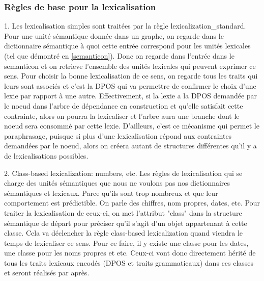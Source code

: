 \subsubsection{Règles de base pour la lexicalisation}

1. Les lexicalisation simples sont traitées par la règle lexicalization\_standard. Pour une unité sémantique donnée dans un graphe, on regarde dans le dictionnaire sémantique à quoi cette entrée correspond pour les unités lexicales (tel que démontré en \ref{semanticon}). Donc on regarde dans l'entrée dans le semanticon et on retrieve l'ensemble des unités lexicales qui peuvent exprimer ce sens. Pour choisir la bonne lexicalisation de ce sens, on regarde tous les traits qui leurs sont associés et c'est la DPOS qui va permettre de confirmer le choix d'une lexie par rapport à une autre. Effectivement, si la lexie a la DPOS demandée par le noeud dans l'arbre de dépendance en construction et qu'elle satisfait cette contrainte, alors on pourra la lexicaliser et l'arbre aura une branche dont le noeud sera consommé par cette lexie. D'ailleurs, c'est ce mécanisme qui permet le paraphrasage, puisque si plus d'une lexicalisation répond aux contraintes demandées par le noeud, alors on créera autant de structures différentes qu'il y a de lexicalisations possibles. 

2. Class-based lexicalization: numbers, etc. Les règles de lexicalisation qui se charge des unités sémantiques que nous ne voulons pas nos dictionnaires sémantiques et lexicaux.  Parce qu'ils sont trop nombreux et que leur comportement est prédictible. On parle des chiffres, nom propres, dates, etc. Pour traiter la lexicalisation de ceux-ci, on met l'attribut "class" dans la structure sémantique de départ pour préciser qu'il s'agit d'un objet appartenant à cette classe. Cela va déclencher la règle class-based lexicalization quand viendra le temps de lexicaliser ce sens. Pour ce faire, il y existe une classe pour les dates, une classe pour les noms propres et etc. Ceux-ci vont donc directement hérité de tous les traits lexicaux encodés (DPOS et traits grammaticaux) dans ces classes et seront réalisés par après. 

